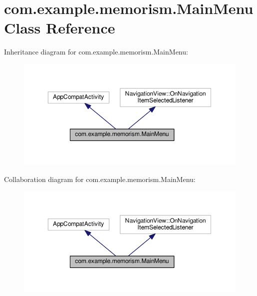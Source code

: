 \hypertarget{classcom_1_1example_1_1memorism_1_1_main_menu}{}\section{com.\+example.\+memorism.\+Main\+Menu Class Reference}
\label{classcom_1_1example_1_1memorism_1_1_main_menu}


Inheritance diagram for com.\+example.\+memorism.\+Main\+Menu\+:
\nopagebreak
\begin{figure}[H]
\begin{center}
\leavevmode
\includegraphics[width=350pt]{de/ddb/classcom_1_1example_1_1memorism_1_1_main_menu__inherit__graph}
\end{center}
\end{figure}


Collaboration diagram for com.\+example.\+memorism.\+Main\+Menu\+:
\nopagebreak
\begin{figure}[H]
\begin{center}
\leavevmode
\includegraphics[width=350pt]{d0/d04/classcom_1_1example_1_1memorism_1_1_main_menu__coll__graph}
\end{center}
\end{figure}
